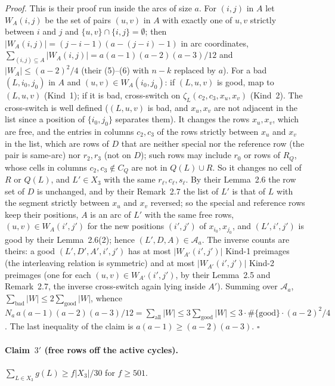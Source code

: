 \documentclass[11pt]{article}
\theoremstyle{definition}
\begin{document}
\emph{Proof.}  This is their proof run inside the arcs of size $a$.  For $(i,j)$ in $A$ let
$W_A(i,j)$ be the set of pairs $(u,v)$ in $A$ with exactly one of $u,v$ strictly between $i$
and $j$ and $\{u,v\}\cap\{i,j\}=\emptyset$; then $|W_A(i,j)|=(j-i-1)(a-(j-i)-1)$ in arc
coordinates, $\sum_{(i,j)\subseteq A}|W_A(i,j)|=a(a-1)(a-2)(a-3)/12$ and $|W_A|\le(a-2)^2/4$
(their (5)--(6) with $n-k$ replaced by $a$).  For a bad $(L,i_0,j_0)$ in $A$ and
$(u,v)\in W_A(i_0,j_0)$: if $(L,u,v)$ is good, map to $(L,u,v)$ (Kind~1); if it is bad,
cross-switch on $\zeta_L(c_2,c_3,x_u,x_v)$ (Kind~2).  The cross-switch is well defined
($(L,u,v)$ is bad, and $x_u,x_v$ are not adjacent in the list since a position of
$\{i_0,j_0\}$ separates them).  It changes the rows $x_u,x_v$, which are free, and the
entries in columns $c_2,c_3$ of the rows strictly between $x_u$ and $x_v$ in the list,
which are rows of $D$ that are neither special nor the reference row (the pair is
same-arc) nor $r_2,r_3$ (not on $D$); such rows may include $r_0$ or rows of $R_Q$, whose
cells in columns $c_2,c_3\notin C_Q$ are not in $Q(L)\cup R$.  So it changes no cell of
$R$ or $Q(L)$, and $L'\in X_3$ with the same $r_\ell,c_\ell,s_\ell$.  By their Lemma~2.6 the
row set of $D$ is unchanged, and by their Remark~2.7 the list of $L'$ is that of $L$ with
the segment strictly between $x_u$ and $x_v$ reversed; so the special and reference rows
keep their positions, $A$ is an arc of $L'$ with the same free rows, $(u,v)\in W_A(i',j')$
for the new positions $(i',j')$ of $x_{i_0},x_{j_0}$, and $(L',i',j')$ is good by their
Lemma~2.6(2); hence $(L',D,A)\in\mathcal A_a$.  The inverse counts are theirs: a good
$(L',D',A',i',j')$ has at most $|W_{A'}(i',j')|$ Kind-1 preimages (the interleaving
relation is symmetric) and at most $|W_{A'}(i',j')|$ Kind-2 preimages (one for each
$(u,v)\in W_{A'}(i',j')$, by their Lemma~2.5 and Remark~2.7, the inverse cross-switch
again lying inside $A'$).  Summing over $\mathcal A_a$, $\sum_{\text{bad}}|W|\le2\sum_{\text{good}}|W|$,
whence $N_a\,a(a-1)(a-2)(a-3)/12=\sum_{\text{all}}|W|\le3\sum_{\text{good}}|W|\le3\cdot\#\{\text{good}\}\cdot(a-2)^2/4$.
The last inequality of the claim is $a(a-1)\ge(a-2)(a-3)$.  $\square$

\paragraph{Claim~$3'$ (free rows off the active cycles).}  $\sum_{L\in X_3}g(L)\ge f|X_3|/30$ for $f\ge501$.
\end{document}

